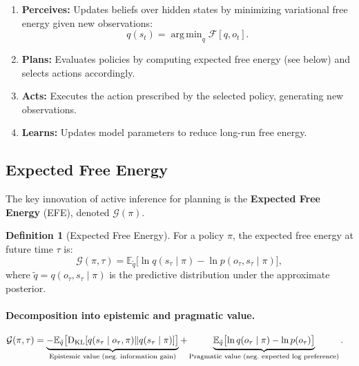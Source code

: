 \documentclass[11pt,a4paper]{article}
\theoremstyle{definition}
\newtheorem{definition}[theorem]{Definition}
\newcommand{\KL}{\mathrm{D}_{\mathrm{KL}}}
\newcommand{\E}{\mathbb{E}}
\newcommand{\cF}{\mathcal{F}}
\newcommand{\cG}{\mathcal{G}}
\DeclareMathOperator*{\argmin}{arg\,min}
\begin{document}
\begin{enumerate}[leftmargin=2em]
  \item \textbf{Perceives:} Updates beliefs over hidden states by minimizing
    variational free energy given new observations:
    \begin{equation}
      q(s_t) = \argmin_{q} \cF[q, o_t].
    \end{equation}
  \item \textbf{Plans:} Evaluates policies by computing expected free energy
    (see below) and selects actions accordingly.
  \item \textbf{Acts:} Executes the action prescribed by the selected policy,
    generating new observations.
  \item \textbf{Learns:} Updates model parameters to reduce long-run free
    energy.
\end{enumerate}

\subsection{Expected Free Energy}
\label{sec:efe}

The key innovation of active inference for planning is the \textbf{Expected
Free Energy} (EFE), denoted $\cG(\pi)$.

\begin{definition}[Expected Free Energy]
For a policy $\pi$, the expected free energy at future time $\tau$ is:
\begin{equation}
  \cG(\pi, \tau) = \E_{\tilde{q}}\bigl[
    \ln q(s_\tau \mid \pi) - \ln p(o_\tau, s_\tau \mid \pi)
  \bigr],
  \label{eq:efe}
\end{equation}
where $\tilde{q} = q(o_\tau, s_\tau \mid \pi)$ is the predictive distribution
under the approximate posterior.
\end{definition}

\paragraph{Decomposition into epistemic and pragmatic value.}
\begin{align}
  \cG(\pi, \tau)
  &= \underbrace{-\E_{\tilde{q}}\bigl[
       \KL[q(s_\tau \mid o_\tau, \pi) \| q(s_\tau \mid \pi)]
     \bigr]}_{\text{Epistemic value (neg.\ information gain)}}
  + \underbrace{\E_{\tilde{q}}\bigl[
       \ln q(o_\tau \mid \pi) - \ln p(o_\tau)
     \bigr]}_{\text{Pragmatic value (neg.\ expected log preference)}}.
  \notag
\end{align}
\end{document}
